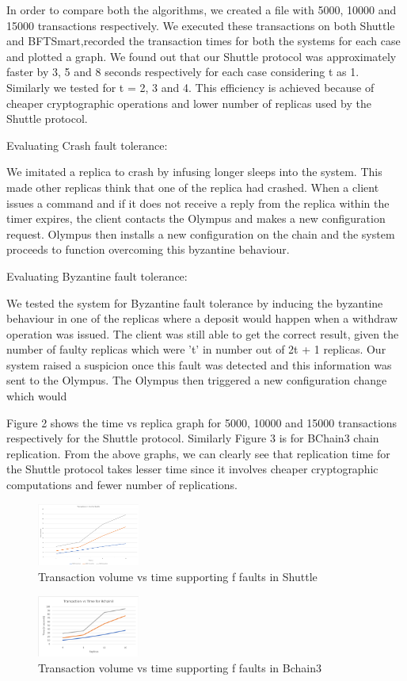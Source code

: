 \documentclass[letterpaper, 10 pt, conference]{ieeeconf}  %
\begin{document}
In order to compare both the algorithms, we created a file with 5000, 10000 and 15000 transactions respectively. We executed these transactions on both Shuttle and BFTSmart,recorded the transaction times for both the systems for each case and plotted a graph. We found out that our Shuttle protocol was approximately faster by 3, 5 and 8 seconds respectively for each case considering t as 1. Similarly we tested for t = 2, 3 and 4. This efficiency is achieved because of cheaper cryptographic operations and lower number of replicas used by the Shuttle protocol.

Evaluating Crash fault tolerance:

We imitated a replica to crash by infusing longer sleeps into the system. This made other replicas think that one of the replica had crashed. When a client issues a command and if it does not receive a reply from the replica within the timer expires, the client contacts the Olympus and makes a new configuration request. Olympus then installs a new configuration on the chain and the system proceeds to function overcoming this byzantine behaviour.

Evaluating Byzantine fault tolerance:

We tested the system for Byzantine fault tolerance by inducing the byzantine behaviour in one of the replicas where a deposit would happen when a withdraw operation was issued. The client was still able to get the correct result, given the number of faulty replicas which were 't' in number out of  2t + 1 replicas. Our system raised a suspicion once this fault was detected and this information was sent to the Olympus. The Olympus then triggered a new configuration change which would 

Figure 2 shows the time vs replica graph for 5000, 10000 and 15000 transactions respectively for the Shuttle protocol. Similarly Figure 3 is for BChain3 chain replication. From the above graphs, we can clearly see that replication time for the Shuttle protocol takes lesser time since it involves cheaper cryptographic computations and fewer number of replications.


\begin{figure}
  \centering
  \caption{ Transaction volume vs time supporting f faults in Shuttle}
  \includegraphics[width=0.3\textwidth]
    {ShuttleGraph}
\end{figure}
\begin{figure}
  \centering
  \caption{ Transaction volume vs time supporting f faults in Bchain3}
  \includegraphics[width=0.3\textwidth]
    {BChain3}
\end{figure}
\end{document}
